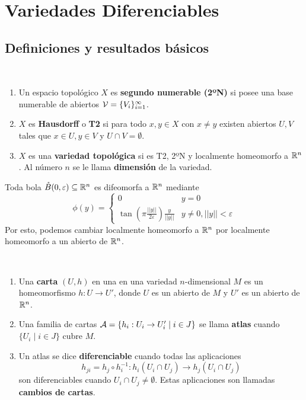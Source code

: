 \documentclass[CV.tex]{subfiles}
\begin{document}

\chapter{Variedades Diferenciables}

\section{Definiciones y resultados básicos}
\begin{defi}\
\begin{enumerate}
\item Un espacio topológico $X$ es \textbf{segundo numerable (2ºN)} si posee una base numerable de abiertos $\mathcal{V}=\{V_i\}_{i=1}^{\infty}$. 
\item $X$ es \textbf{Hausdorff} o \textbf{T2} si para todo $x,y\in X$ con $x\neq y$ existen abiertos $U,V$ tales que $x\in U, y\in V$ y $U\cap V=\emptyset$.
\item $X$ es una \textbf{variedad topológica} si es T2, 2ºN y localmente homeomorfo a $\mathbb{R}^n$. Al número $n$ se le llama \textbf{dimensión} de la variedad. 
\end{enumerate}
\end{defi}

\begin{nota}\label{nota}
Toda bola $\mathring{B}(0,\varepsilon)\subseteq\mathbb{R}^n$ es difeomorfa a $\mathbb{R}^n$ mediante
\[
\phi(y)=\begin{cases}
0 & y=0\\
\tan\left(\pi\frac{||y||}{2\varepsilon}\right)\frac{y}{||y||} & y\neq 0, ||y||<\varepsilon
\end{cases}
\]
Por esto, podemos cambiar localmente homeomorfo a $\mathbb{R}^n$ por localmente homeomorfo a un abierto de $\mathbb{R}^n$.
\end{nota}

\begin{defi}\
\begin{enumerate}
\item Una \textbf{carta} $(U,h)$ en una en una variedad $n$-dimensional $M$ es un homeomorfismo $h:U\to U'$, donde $U$ es un abierto de $M$ y $U'$ es un abierto de $\mathbb{R}^n$.
\item Una familia de cartas $\mathcal{A}=\{h_i:U_i\to U_i'\mid i\in J\}$ se llama \textbf{atlas} cuando $\{U_i\mid i\in J\}$ cubre $M$.
\item Un atlas se dice \textbf{diferenciable} cuando todas las aplicaciones
\[
h_{ji}=h_j\circ h_i^{-1}: h_i(U_i\cap U_j)\to h_j(U_i\cap U_j)
\]
son diferenciables cuando $U_i\cap U_j\neq\emptyset$. Estas aplicaciones son llamadas \textbf{cambios de cartas}. 
\end{enumerate}
\end{defi}
\end{document}
